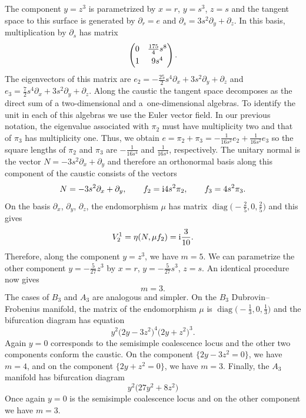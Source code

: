 \documentclass[pdftex]{sigma}
\numberwithin{equation}{section}
\begin{document}
The component $y=z^{3}$ is parametrized by $x=r$, $y=s^{3}$, $z=s$ and the tangent space to this surface is generated by $\partial_{r}=e$ and $\partial_{s}=3s^{2}\partial_{y}+\partial_{z}$. In this basis, multiplication by $\partial_{s}$ has matrix
\begin{equation*}
 \begin{pmatrix}
 0&\frac{175}{4}s^{8}\vspace{1mm}\\
 1& 9s^{4}
 \end{pmatrix}.
\end{equation*}
The eigenvectors of this matrix are $e_{2}=-\tfrac{25}{2}s^{4}\partial_{x}+3s^{2}\partial_{y}+\partial_{z}$ and $e_{3}=\frac{7}{2}s^{4}\partial_{x}+3s^{2}\partial_{y}+\partial_{z}$. Along the caustic the tangent space decomposes as the direct sum of a two-dimensional and a~one-dimensional algebras. To identify the unit in each of this algebras we use the Euler vector field. In our previous notation, the eigenvalue associated with $\pi_{2}$ must have multiplicity two and that of $\pi_{3}$ has multiplicity one. Thus, we obtain $e=\pi_{2}+\pi_{3}=-\frac{1}{16s^{2}}e_{2}+\frac{1}{16s^{2}}e_{3}$ so the square lengths of $\pi_{2}$ and $\pi_{3}$ are $-\frac{1}{16s^{4}}$ and $\frac{1}{16s^{4}}$, respectively. The unitary normal is the vector $N=-3s^{2}\partial_{x}+\partial_{y}$ and therefore an orthonormal basis along this component of the caustic consists of the vectors
\[
 N=-3s^{2}\partial_{x}+\partial_{y},\qquad
 f_{2}={\rm i}4s^{2}\pi_{2},\qquad
 f_{3}=4s^{2}\pi_{3}.
\]
On the basis $\partial_{x}$, $\partial_{y}$, $\partial_{z}$, the endomorphism $\mu$ has matrix $\operatorname{diag}\bigl(-\tfrac{2}{5},0,\tfrac{2}{5}\bigr)$ and this gives
\begin{equation*}
 V_{2}^{1}=\eta(N,\mu f_{2})={\rm i}\frac{3}{10}.
\end{equation*}
Therefore, along the component $y=z^{3}$, we have $m=5$. We can parametrize the other component $y=-\tfrac{5}{27}z^{3}$ by $x=r$, $y=-\tfrac{5}{27}s^{3}$, $z=s$. An identical procedure now gives
\begin{equation*}
 m=3.
\end{equation*}
The cases of $B_{3}$ and $A_{3}$ are analogous and simpler. On the $B_{3}$ Dubrovin--Frobenius manifold, the matrix of the endomorphism $\mu$ is $\operatorname{diag}\bigl(-\tfrac{1}{3},0,\tfrac{1}{3}\bigr)$ and the bifurcation diagram has equation
\begin{equation*}
 y^{2}\bigl(2y-3z^{2}\bigr)^{4}\bigl(2y+z^{2}\bigr)^{3}.
\end{equation*}
Again $y=0$ corresponds to the semisimple coalescence locus and the other two components conform the caustic. On the component $\big\{2y-3z^{2}=0 \big\}$, we have $m=4$, and on the component $\big\{2y+z^{2}=0 \big\}$, we have $m=3$. Finally, the $A_{3}$ manifold has bifurcation diagram
\begin{equation*}
 y^{2}\bigl(27y^{2}+8z^{2}\bigr)
\end{equation*}
Once again $y=0$ is the semisimple coalescence locus and on the other component we have $m=3$.
\end{document}
